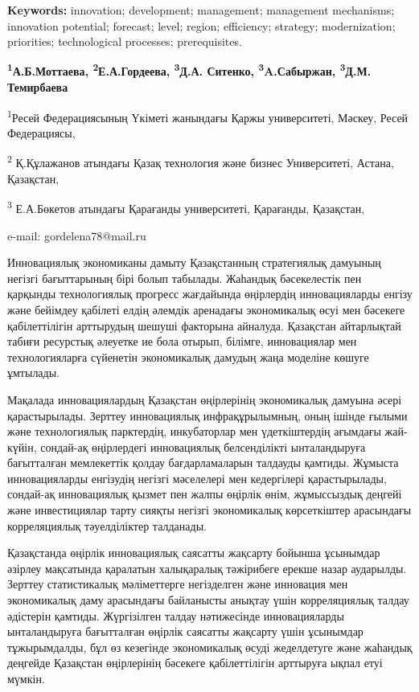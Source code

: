 {\bfseries Keywords:} innovation; development; management; management
mechanisms; innovation potential; forecast; level; region; efficiency;
strategy; modernization; priorities; technological processes;
prerequisites.


\begin{center}
{\bfseries \textsuperscript{1}А.Б.Моттаева,
\textsuperscript{2}Е.А.Гордеева\envelope,
\textsuperscript{3}Д.А. Ситенко, \textsuperscript{3}A.Сабыржан,
\textsuperscript{3}Д.М.} {\bfseries Темирбаева}

\textsuperscript{1}Ресей Федерациясының Үкіметі жанындағы Қаржы
университеті, Мәскеу, Ресей Федерациясы,

\textsuperscript{2} Қ.Құлажанов атындағы Қазақ технология және бизнес
Университеті, Астана, Қазақстан,

\textsuperscript{3} Е.А.Бөкетов атындағы Қарағанды университеті,
Қарағанды, Қазақстан,

e-mail: gordelena78@mail.ru
\end{center}

Инновациялық экономиканы дамыту Қазақстанның стратегиялық дамуының
негізгі бағыттарының бірі болып табылады. Жаһандық бәсекелестік пен
қарқынды технологиялық прогресс жағдайында өңірлердің инновацияларды
енгізу және бейімдеу қабілеті елдің әлемдік аренадағы экономикалық өсуі
мен бәсекеге қабілеттілігін арттырудың шешуші факторына айналуда.
Қазақстан айтарлықтай табиғи ресурстық әлеуетке ие бола отырып, білімге,
инновациялар мен технологияларға сүйенетін экономикалық дамудың жаңа
моделіне көшуге ұмтылады.

Мақалада инновациялардың Қазақстан өңірлерінің экономикалық дамуына
әсері қарастырылады. Зерттеу инновациялық инфрақұрылымның, оның ішінде
ғылыми және технологиялық парктердің, инкубаторлар мен үдеткіштердің
ағымдағы жай-күйін, сондай-ақ өңірлердегі инновациялық белсенділікті
ынталандыруға бағытталған мемлекеттік қолдау бағдарламаларын талдауды
қамтиды. Жұмыста инновацияларды енгізудің негізгі мәселелері мен
кедергілері қарастырылады, сондай-ақ инновациялық қызмет пен жалпы
өңірлік өнім, жұмыссыздық деңгейі және инвестициялар тарту сияқты
негізгі экономикалық көрсеткіштер арасындағы корреляциялық тәуелділіктер
талданады.

Қазақстанда өңірлік инновациялық саясатты жақсарту бойынша ұсынымдар
әзірлеу мақсатында қаралатын халықаралық тәжірибеге ерекше назар
аударылды. Зерттеу статистикалық мәліметтерге негізделген және инновация
мен экономикалық даму арасындағы байланысты анықтау үшін корреляциялық
талдау әдістерін қамтиды. Жүргізілген талдау нәтижесінде инновацияларды
ынталандыруға бағытталған өңірлік саясатты жақсарту үшін ұсынымдар
тұжырымдалды, бұл өз кезегінде экономикалық өсуді жеделдетуге және
жаһандық деңгейде Қазақстан өңірлерінің бәсекеге қабілеттілігін
арттыруға ықпал етуі мүмкін.


